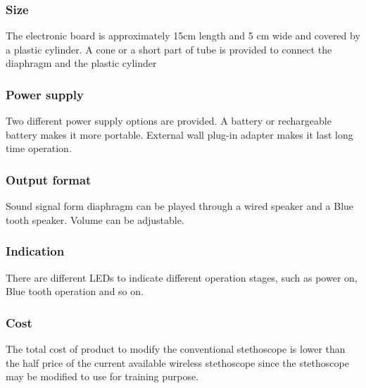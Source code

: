 \subsubsection{Size}
The electronic board is approximately 15cm length and 5 cm wide and covered by a plastic cylinder. A cone or a short part of tube is provided to connect the diaphragm and the plastic cylinder 
 
\subsubsection{Power supply}
Two different power supply options are provided.
A battery or rechargeable battery makes it more portable.
External wall plug-in adapter makes it last long time operation.

\subsubsection{Output format}
Sound signal form diaphragm can be played through a wired speaker and a Blue tooth speaker.
Volume can be adjustable.

\subsubsection{Indication}
There are different LEDs to indicate different operation stages, such as power on, Blue tooth operation and so on.

\subsubsection{Cost}
The total cost of product to modify the conventional stethoscope is lower than the half price of the current available wireless stethoscope since the stethoscope may be modified to use for training purpose.
